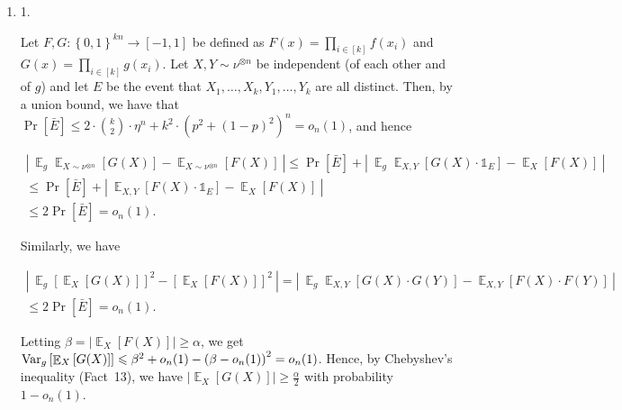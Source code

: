\documentclass[10pt,a4paper]{article}
\begin{document}
\begin{enumerate}


\item[] 
1. 


Let $F,G:\left\{0,1\right\}^{kn}\to[-1,1]$ be defined as $F(x)=\prod_{i\in[k]}f\left(x_{i}\right)$ and $G(x)=\prod_{i\in[k]}g\left(x_{i}\right)$.
Let $X,Y\sim\nu^{\otimes n}$ be independent (of each other and of $g$) and let $E$ be the event that $X_{1},\dots,X_{k},Y_{1},\dots,Y_{k}$ are all distinct.
Then, by a union bound, we have that $\Pr\left[\bar{E}\right]\leqslant 2\cdot\binom{k}{2}\cdot\eta^{n}+k^{2}\cdot\left(p^{2}+\left(1-p\right)^{2}\right)^{n}=o_{n}(1)$, and hence\par




\[\begin{gathered}
\displaystyle\left|\ \mathop{\mathbb{E}}_{g}\mathop{\mathbb{E}}_{X\sim\nu^{\otimes n}}\left[G(X)\right]-\mathop{\mathbb{E}}_{X\sim\nu^{\otimes n}}\left[F(X)\right]\ \right| \displaystyle\leqslant\Pr\left[\bar{E}\right]+\left|\ \mathop{\mathbb{E}}_{g}\mathop{\mathbb{E}}_{X,Y}\left[G(X)\cdot\mathds{1}_{E}\right]-\mathop{\mathbb{E}}_{X}\left[F(X)\right]\ \right| \\
\displaystyle\leqslant\Pr\left[\bar{E}\right]+\left|\ \mathop{\mathbb{E}}_{X,Y}\left[F(X)\cdot\mathds{1}_{E}\right]-\mathop{\mathbb{E}}_{X}\left[F(X)\right]\ \right| \\
\displaystyle\leqslant 2\Pr\left[\bar{E}\right]=o_{n}(1).
\end{gathered}\]


Similarly, we have\par


\[\begin{gathered}
\displaystyle\left|\ \mathop{\mathbb{E}}_{g}\left[\mathop{\mathbb{E}}_{X}\left[G(X)\right]\right]^{2}-\left[\mathop{\mathbb{E}}_{X}\left[F(X)\right]\right]^{2}\ \right| \displaystyle=\left|\ \mathop{\mathbb{E}}_{g}\mathop{\mathbb{E}}_{X,Y}\left[G(X)\cdot G(Y)\right]-\mathop{\mathbb{E}}_{X,Y}\left[F(X)\cdot F(Y)\right]\ \right| \\
\displaystyle\leqslant 2\Pr\left[\bar{E}\right]=o_{n}(1).
\end{gathered}\]




Letting $\beta=\left|\mathop{\mathbb{E}}_{X}\left[F(X)\right]\right|\geqslant\alpha$, we get
$\textnormal{Var}_{g}\left[\mathop{\mathbb{E}}_{X}\left[G(X)\right]\right]\leqslant\beta^{2}+o_{n}(1)-\left(\beta-o_{n}(1)\right)^{2}=o_{n}(1)$.
Hence, by Chebyshev’s inequality (Fact 13), we have $\left|\mathop{\mathbb{E}}_{X}\left[G(X)\right]\right|\geqslant\frac{\alpha}{2}$ with probability $1-o_{n}(1)$.\par






\end{enumerate}
\end{document}
